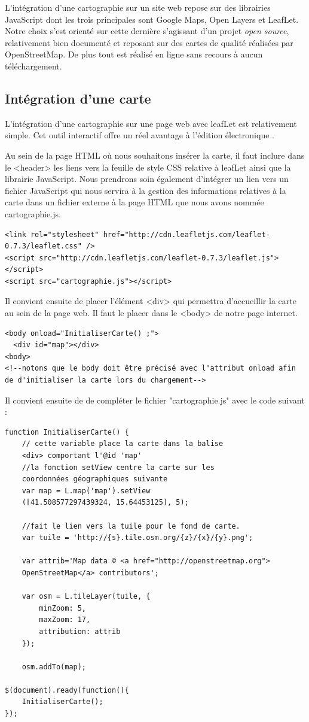 \documentclass[12pt,a4paper]{book} %
\begin{document}
L'intégration d'une cartographie sur un site web repose sur des librairies JavaScript dont les trois principales sont Google Maps, Open Layers et LeafLet. Notre choix s'est orienté sur cette dernière  s'agissant d'un projet \textit{open source}, relativement bien documenté et reposant sur des cartes de qualité réalisées par OpenStreetMap. De plus tout est réalisé en ligne sans recours à aucun téléchargement. 

\subsection{Intégration d'une carte}
L'intégration d'une cartographie sur une page web avec leafLet est relativement simple. Cet outil interactif offre un réel avantage à l'édition électronique .

Au sein de la page HTML où nous souhaitons insérer la carte, il faut inclure dans le <header> les liens vers la feuille de style CSS relative à leafLet ainsi que la librairie JavaScript. Nous prendrons soin également d'intégrer un lien vers un fichier JavaScript qui nous servira à la gestion des informations relatives à la carte dans un fichier externe à la page HTML que nous avons nommée cartographie.js. 
\begin{lstlisting}
<link rel="stylesheet" href="http://cdn.leafletjs.com/leaflet-0.7.3/leaflet.css" />
<script src="http://cdn.leafletjs.com/leaflet-0.7.3/leaflet.js"></script>
<script src="cartographie.js"></script>
\end{lstlisting}

Il convient ensuite de placer l'élément <div> qui permettra d'accueillir la carte au sein de la page web. Il faut le placer dans le <body> de notre page internet.

\begin{lstlisting}
<body onload="InitialiserCarte() ;">
  <div id="map"></div>
<body>
<!--notons que le body doit être précisé avec l'attribut onload afin de d'initialiser la carte lors du chargement-->
\end{lstlisting}

Il convient ensuite de de compléter le fichier "cartographie.js" avec le code suivant : 

\begin{verbatim}
function InitialiserCarte() {
	// cette variable place la carte dans la balise 
	<div> comportant l'@id 'map'
	//la fonction setView centre la carte sur les 
	coordonnées géographiques suivante
    var map = L.map('map').setView
    ([41.508577297439324, 15.64453125], 5);

    //fait le lien vers la tuile pour le fond de carte.
    var tuile = 'http://{s}.tile.osm.org/{z}/{x}/{y}.png';
    
    var attrib='Map data © <a href="http://openstreetmap.org">
    OpenStreetMap</a> contributors';
    
    var osm = L.tileLayer(tuile, {
        minZoom: 5, 
        maxZoom: 17,
        attribution: attrib
    });

    osm.addTo(map);

$(document).ready(function(){
    InitialiserCarte();
});
\end{verbatim}
\end{document}
